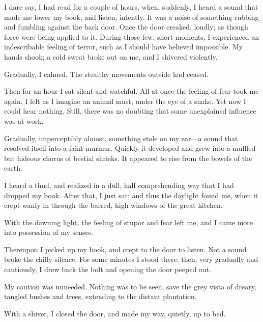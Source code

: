 I dare say, I had read for a couple of hours, when, suddenly, I heard a sound that made me lower my book, and listen, intently. It was a noise of something rubbing and fumbling against the back door. Once the door creaked, loudly; as though force were being applied to it. During those few, short moments, I experienced an indescribable feeling of terror, such as I should have believed impossible. My hands shook; a cold sweat broke out on me, and I shivered violently.

Gradually, I calmed. The stealthy movements outside had ceased.

Then for an hour I sat silent and watchful. All at once the feeling of fear took me again. I felt as I imagine an animal must, under the eye of a snake. Yet now I could hear nothing. Still, there was no doubting that some unexplained influence was at work.

Gradually, imperceptibly almost, something stole on my ear---a sound that resolved itself into a faint murmur. Quickly it developed and grew into a muffled but hideous chorus of bestial shrieks. It appeared to rise from the bowels of the earth.

I heard a thud, and realized in a dull, half comprehending way that I had dropped my book. After that, I just sat; and thus the daylight found me, when it crept wanly in through the barred, high windows of the great kitchen.

With the dawning light, the feeling of stupor and fear left me; and I came more into possession of my senses.

Thereupon I picked up my book, and crept to the door to listen. Not a sound broke the chilly silence. For some minutes I stood there; then, very gradually and cautiously, I drew back the bolt and opening the door peeped out.

My caution was unneeded. Nothing was to be seen, save the grey vista of dreary, tangled bushes and trees, extending to the distant plantation.

With a shiver, I closed the door, and made my way, quietly, up to bed.

\clearpage


